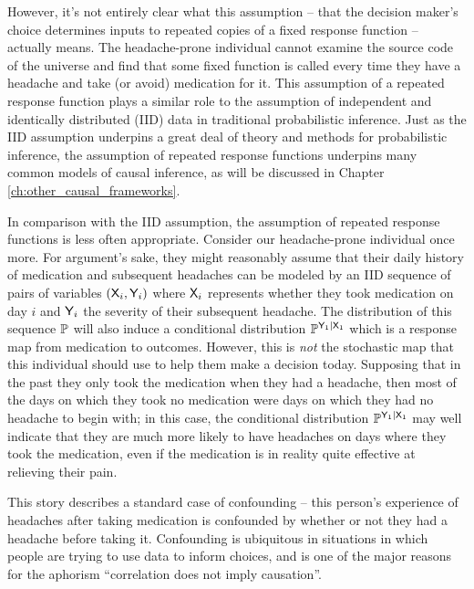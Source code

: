 However, it's not entirely clear what this assumption -- that the decision maker's choice determines inputs to repeated copies of a fixed response function -- actually means. The headache-prone individual cannot examine the source code of the universe and find that some fixed function is called every time they have a headache and take (or avoid) medication for it. This assumption of a repeated response function plays a similar role to the assumption of independent and identically distributed (IID) data in traditional probabilistic inference. Just as the IID assumption underpins a great deal of theory and methods for probabilistic inference, the assumption of repeated response functions underpins many common models of causal inference, as will be discussed in Chapter \ref{ch:other_causal_frameworks}.

In comparison with the IID assumption, the assumption of repeated response functions is less often appropriate. Consider our headache-prone individual once more. For argument's sake, they might reasonably assume that their daily history of medication and subsequent headaches can be modeled by an IID sequence of pairs of variables $(\mathsf{X}_i,\mathsf{Y}_i)$ where $\mathsf{X}_i$ represents whether they took medication on day $i$ and $\mathsf{Y}_i$ the severity of their subsequent headache. The distribution of this sequence $\mathbb{P}$ will also induce a conditional distribution $\mathbb{P}^{\mathsf{Y}_1|\mathsf{X}_1}$ which is a response map from medication to outcomes. However, this is \emph{not} the stochastic map that this individual should use to help them make a decision today. Supposing that in the past they only took the medication when they had a headache, then most of the days on which they took no medication were days on which they had no headache to begin with; in this case, the conditional distribution $\mathbb{P}^{\mathsf{Y}_1|\mathsf{X}_1}$ may well indicate that they are much more likely to have headaches on days where they took the medication, even if the medication is in reality quite effective at relieving their pain.

This story describes a standard case of confounding -- this person's experience of headaches after taking medication is confounded by whether or not they had a headache before taking it. Confounding is ubiquitous in situations in which people are trying to use data to inform choices, and is one of the major reasons for the aphorism ``correlation does not imply causation''.

